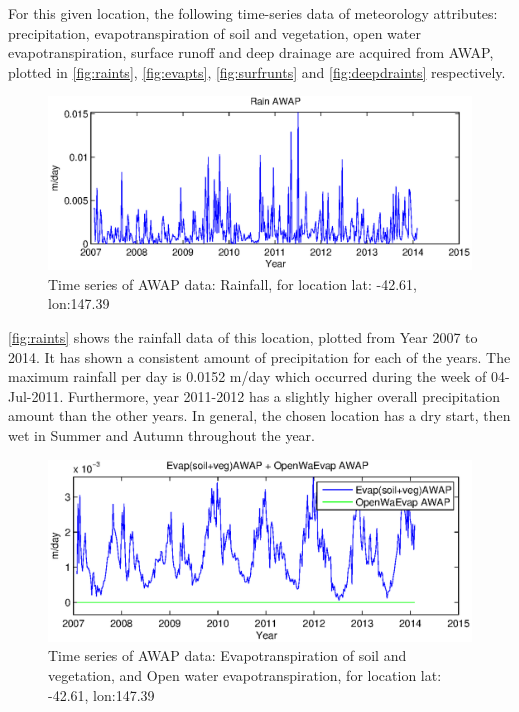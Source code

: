 \newline
For this given location, the following time-series data of meteorology attributes: precipitation, evapotranspiration of soil and vegetation, open water evapotranspiration, surface runoff and deep drainage are acquired from AWAP, plotted in \autoref{fig:raints}, \autoref{fig:evapts}, \autoref{fig:surfrunts} and \autoref{fig:deepdraints} respectively. \\
\begin{figure}[hbt]
\begin{center}
\includegraphics[width=\linewidth]{gfx/raints.eps}
\end{center}
\caption{Time series of AWAP data: Rainfall, for location lat: -42.61, lon:147.39}
\label{fig:raints}
\end{figure}
\newline
\autoref{fig:raints} shows the rainfall data of this location, plotted from Year 2007 to 2014. It has shown a consistent amount of precipitation for each of the years. The maximum rainfall per day is 0.0152 m/day which occurred during the week of 04-Jul-2011. Furthermore, year 2011-2012 has a slightly higher overall precipitation amount than the other years. In general, the chosen location has a dry start, then wet in Summer and Autumn throughout the year. \\
\begin{figure}[hbt]
\begin{center}
\includegraphics[width=\linewidth]{gfx/evapts.eps}
\end{center}
\caption{Time series of AWAP data: Evapotranspiration of soil and vegetation, and Open water evapotranspiration, for location lat: -42.61, lon:147.39}
\label{fig:evapts}
\end{figure}
